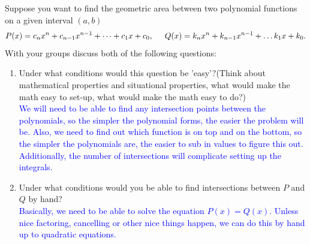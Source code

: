 \documentclass{ximera}
\begin{document}
 \begin{exercise}
     Suppose you want to find the geometric area between two polynomial functions on a given interval $(a,b)$
         \begin{align}
         	P(x) = c_{n}x^n + c_{n-1}x^{n-1} + \dots +c_1x+ c_{0}, \hspace{.2in} Q(x) = k_{n}x^n + k_{n-1}x^{n-1} + \dots k_1x+ k_{0}.\nonumber
         \end{align}
 With your groups discuss both of the following questions:
         \begin{enumerate}
             \item Under what conditions would this question be 'easy'?(Think about mathematical properties and situational properties, what would make the math easy to set-up, what would make the math easy to do?)\\
             \textcolor{blue}{We will need to be able to find any intersection points between the polynomials, so the simpler the polynomial forms, the easier the problem will be.  Also, we need to find out which function is on top and on the bottom, so the simpler the polynomials are, the easier to sub in values to figure this out.  Additionally, the number of intersections will complicate setting up the integrals. }
             \item Under what conditions would you be able to find intersections between $P$ and $Q$ by hand?\\
             \textcolor{blue}{Basically, we need to be able to solve the equation $P(x)=Q(x)$.  Unless nice factoring, cancelling or other nice things happen, we can do this by hand up to quadratic equations.}
         \end{enumerate}
 \end{exercise}
\end{document}
